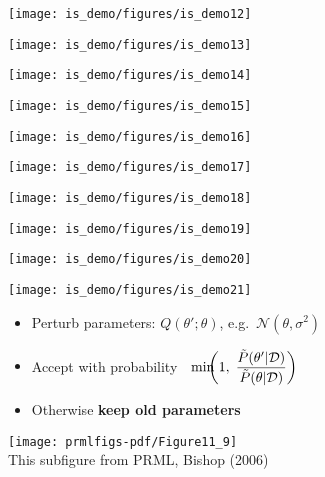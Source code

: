 \documentclass[25pt,landscape]{foils}
\newcommand{\Gray}{\textcolor{mygray}}
\newcommand{\D}{\mathcal{D}}
\newcommand{\N}{\mathcal{N}}
\begin{document}
\begin{minipage}{0.19\linewidth}\texttt{[image: is\_demo/figures/is\_demo12]}
\end{minipage}
\begin{minipage}{0.19\linewidth}\texttt{[image: is\_demo/figures/is\_demo13]}
\end{minipage}
\begin{minipage}{0.19\linewidth}\texttt{[image: is\_demo/figures/is\_demo14]}
\end{minipage}
\begin{minipage}{0.19\linewidth}\texttt{[image: is\_demo/figures/is\_demo15]}
\end{minipage}
\begin{minipage}{0.19\linewidth}\texttt{[image: is\_demo/figures/is\_demo16]}
\end{minipage}
\begin{minipage}{0.19\linewidth}\texttt{[image: is\_demo/figures/is\_demo17]}
\end{minipage}
\begin{minipage}{0.19\linewidth}\texttt{[image: is\_demo/figures/is\_demo18]}
\end{minipage}
\begin{minipage}{0.19\linewidth}\texttt{[image: is\_demo/figures/is\_demo19]}
\end{minipage}
\begin{minipage}{0.19\linewidth}\texttt{[image: is\_demo/figures/is\_demo20]}
\end{minipage}
\begin{minipage}{0.19\linewidth}\texttt{[image: is\_demo/figures/is\_demo21]}
\end{minipage}

\vfill

\begin{minipage}{0.7\linewidth}
\begin{itemize}
    \setlength{\itemsep}{5pt}
    \setlength{\parskip}{5pt}
    \setlength{\parsep}{0cm}
\item Perturb parameters: $Q(\theta';\theta)$, e.g.\ $\N(\theta,\sigma^2)$
\item Accept with probability $\displaystyle\kern6pt\min\kern-6pt\left(1,\; \frac{\tilde{P}(\theta'|\D)}{\tilde{P}(\theta|\D)}\right)$
\item Otherwise \textbf{keep old parameters}
\end{itemize}
\end{minipage}
\begin{minipage}{0.3\linewidth}
    \texttt{[image: prmlfigs-pdf/Figure11\_9]}\\[-1cm]
    \Gray{\tiny This subfigure from PRML, Bishop (2006)}
\end{minipage}
\end{document}
